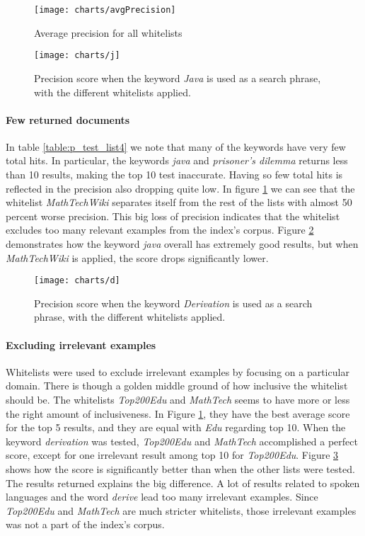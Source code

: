 \begin{figure}[H] 
\caption{Average precision for all whitelists}
\texttt{[image: charts/avgPrecision]}
\label{fig:avgPrecision}
\end{figure}


\begin{figure}[h] 
\caption{Precision score when the keyword \textit{Java} is used as a search phrase, with the different whitelists applied.}
\texttt{[image: charts/j]}
\label{fig:j}
\end{figure}

\paragraph{Few returned documents}
In table \ref{table:p_test_list4} we note that many of the keywords have very few total hits. In particular, the keywords \textit{java} and \textit{prisoner's dilemma} returns less than 10 results, making the top 10 test inaccurate. Having so few total hits is reflected in the precision also dropping quite low. In figure \ref{fig:avgPrecision} we can see that the whitelist \textit{MathTechWiki} separates itself from the rest of the lists with almost 50 percent worse precision. This big loss of precision indicates that the whitelist excludes too many relevant examples from the index's corpus. Figure \ref{fig:j} demonstrates how the keyword \textit{java} overall has extremely good results, but when \textit{MathTechWiki} is applied, the score drops significantly lower.

\begin{figure}[h] 
\caption{Precision score when the keyword \textit{Derivation} is used as a search phrase, with the different whitelists applied.}
\texttt{[image: charts/d]}
\label{fig:d}
\end{figure}

\paragraph{Excluding irrelevant examples}
Whitelists were used to exclude irrelevant examples by focusing on a particular domain. There is though a golden middle ground of how inclusive the whitelist should be. The whitelists \textit{Top200Edu} and \textit{MathTech} seems to have more or less the right amount of inclusiveness. In Figure \ref{fig:avgPrecision}, they have the best average score for the top 5 results, and they are equal with \textit{Edu} regarding top 10. When the keyword \textit{derivation} was tested, \textit{Top200Edu} and \textit{MathTech} accomplished a perfect score, except for one irrelevant result among top 10 for \textit{Top200Edu}. Figure \ref{fig:d} shows how the score is significantly better than when the other lists were tested. The results returned explains the big difference. A lot of results related to spoken languages and the word \textit{derive} lead too many irrelevant examples. Since \textit{Top200Edu} and \textit{MathTech} are much stricter whitelists, those irrelevant examples was not a part of the index's corpus.

